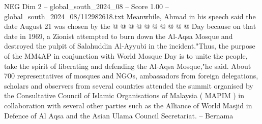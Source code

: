 \begin{textsample}{NEG Dim 2 – global\_south\_2024\_08 – Score 1.00 – global\_south\_2024\_08/112982618.txt}
Meanwhile, Ahmad in his speech said the date August 21 was chosen by the @ @ @ @ @ @ @ @ @ @ Day because on that date in 1969, a Zionist attempted to burn down the Al-Aqsa Mosque and destroyed the pulpit of Salahuddin Al-Ayyubi in the incident."Thus, the purpose of the MM4AP in conjunction with World Mosque Day is to unite the people, take the spirit of liberating and defending the Al-Aqsa Mosque,"he said.
About 700 representatives of mosques and NGOs, ambassadors from foreign delegations, scholars and observers from several countries attended the summit organised by the Consultative Council of Islamic Organisations of Malaysia ( MAPIM ) in collaboration with several other parties such as the Alliance of World Masjid in Defence of Al Aqsa and the Asian Ulama Council Secretariat. -- Bernama

\end{textsample}
